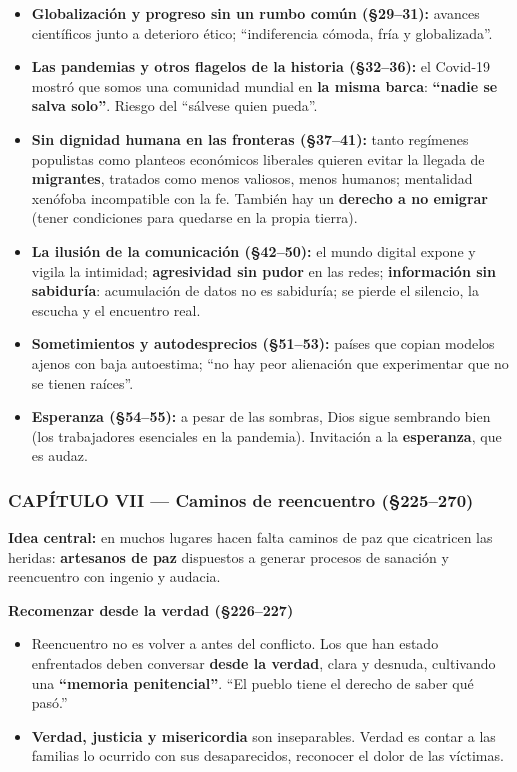 \documentclass[10pt,a4paper]{article}
\begin{document}
\begin{itemize}
\item \textbf{Globalización y progreso sin un rumbo común (\S{}29--31):} avances científicos junto a deterioro ético; ``indiferencia cómoda, fría y globalizada''.
\item \textbf{Las pandemias y otros flagelos de la historia (\S{}32--36):} el Covid-19 mostró que somos una comunidad mundial en \textbf{la misma barca}: \textbf{``nadie se salva solo''}. Riesgo del ``sálvese quien pueda''.
\item \textbf{Sin dignidad humana en las fronteras (\S{}37--41):} tanto regímenes populistas como planteos económicos liberales quieren evitar la llegada de \textbf{migrantes}, tratados como menos valiosos, menos humanos; mentalidad xenófoba incompatible con la fe. También hay un \textbf{derecho a no emigrar} (tener condiciones para quedarse en la propia tierra).
\item \textbf{La ilusión de la comunicación (\S{}42--50):} el mundo digital expone y vigila la intimidad; \textbf{agresividad sin pudor} en las redes; \textbf{información sin sabiduría}: acumulación de datos no es sabiduría; se pierde el silencio, la escucha y el encuentro real.
\item \textbf{Sometimientos y autodesprecios (\S{}51--53):} países que copian modelos ajenos con baja autoestima; ``no hay peor alienación que experimentar que no se tienen raíces''.
\item \textbf{Esperanza (\S{}54--55):} a pesar de las sombras, Dios sigue sembrando bien (los trabajadores esenciales en la pandemia). Invitación a la \textbf{esperanza}, que es audaz.
\end{itemize}

\subsubsection{CAPÍTULO VII --- Caminos de reencuentro (\S{}225--270)}

\noindent \textbf{Idea central:} en muchos lugares hacen falta caminos de paz que cicatricen las heridas: \textbf{artesanos de paz} dispuestos a generar procesos de sanación y reencuentro con ingenio y audacia.\par\smallskip

\medskip\noindent \textbf{Recomenzar desde la verdad (\S{}226--227)}\par\nopagebreak
\begin{itemize}
\item Reencuentro no es volver a antes del conflicto. Los que han estado enfrentados deben conversar \textbf{desde la verdad}, clara y desnuda, cultivando una \textbf{``memoria penitencial''}. ``El pueblo tiene el derecho de saber qué pasó.''
\item \textbf{Verdad, justicia y misericordia} son inseparables. Verdad es contar a las familias lo ocurrido con sus desaparecidos, reconocer el dolor de las víctimas.
\end{itemize}
\end{document}
